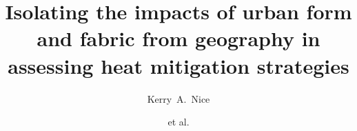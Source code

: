 \documentclass[final,3p,times,authoryear]{elsarticle}
\begin{document}

\title{Isolating the impacts of urban form and fabric from geography in assessing heat mitigation strategies }

\author[melb]{Kerry~A.~Nice}
\author[melb]{et al.}
\address[melb]{Transport, Health, and Urban Design Hub, Faculty of Architecture, Building, and Planning, University of Melbourne, Australia.}
\end{document}
